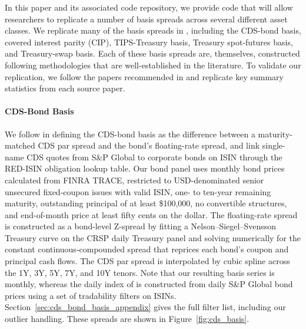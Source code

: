 \documentclass{article}
\begin{document}
In this paper and its associated code repository, we provide code that will allow researchers to replicate a number of basis spreads across several different asset classes. We replicate many of the basis spreads in \cite{Siriwardane2021}, including the CDS-bond basis, covered interest parity (CIP), TIPS-Treasury basis, Treasury spot-futures basis, and Treasury-swap basis.
Each of these basis spreads are, themselves, constructed following methodologies that are well-established in the literature. To validate our replication, we follow the papers recommended in \cite{Siriwardane2021} and replicate key summary statistics from each source paper.




\paragraph{CDS-Bond Basis}

We follow \citet{Siriwardane2021} in defining the CDS-bond basis as the difference between a maturity-matched CDS par spread and the bond's floating-rate spread, and link single-name CDS quotes from S\&P Global to corporate bonds on ISIN through the RED-ISIN obligation lookup table. Our bond panel uses monthly bond prices calculated from FINRA TRACE, restricted to USD-denominated senior unsecured fixed-coupon issues with valid ISIN, one- to ten-year remaining maturity, outstanding principal of at least \$100{,}000, no convertible structures, and end-of-month price at least fifty cents on the dollar. The floating-rate spread is constructed as a bond-level Z-spread by fitting a Nelson--Siegel--Svensson Treasury curve on the CRSP daily Treasury panel \citep{Gurkaynak2007} and solving numerically for the constant continuous-compounded spread that reprices each bond's coupon and principal cash flows. The CDS par spread is interpolated by cubic spline across the 1Y, 3Y, 5Y, 7Y, and 10Y tenors. Note that our resulting basis series is monthly, whereas the daily index of \citet{Siriwardane2021} is constructed from daily S\&P Global bond prices using a set of tradability filters on ISINs. Section~\ref{sec:cds_bond_basis_appendix} gives the full filter list, including our outlier handling.
These spreads are shown in Figure~\ref{fig:cds_basis}.
\end{document}
